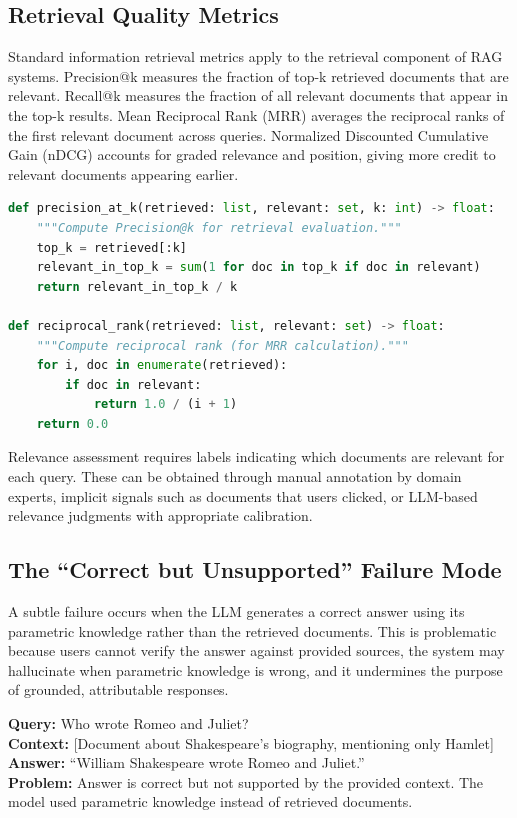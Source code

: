 \subsection{Retrieval Quality Metrics}

Standard information retrieval metrics apply to the retrieval component of RAG systems. Precision@k measures the fraction of top-k retrieved documents that are relevant. Recall@k measures the fraction of all relevant documents that appear in the top-k results. Mean Reciprocal Rank (MRR) averages the reciprocal ranks of the first relevant document across queries. Normalized Discounted Cumulative Gain (nDCG) accounts for graded relevance and position, giving more credit to relevant documents appearing earlier.

\begin{lstlisting}[basicstyle=\small\ttfamily,language=Python]
def precision_at_k(retrieved: list, relevant: set, k: int) -> float:
    """Compute Precision@k for retrieval evaluation."""
    top_k = retrieved[:k]
    relevant_in_top_k = sum(1 for doc in top_k if doc in relevant)
    return relevant_in_top_k / k

def reciprocal_rank(retrieved: list, relevant: set) -> float:
    """Compute reciprocal rank (for MRR calculation)."""
    for i, doc in enumerate(retrieved):
        if doc in relevant:
            return 1.0 / (i + 1)
    return 0.0
\end{lstlisting}

Relevance assessment requires labels indicating which documents are relevant for each query. These can be obtained through manual annotation by domain experts, implicit signals such as documents that users clicked, or LLM-based relevance judgments with appropriate calibration.

\subsection{The ``Correct but Unsupported'' Failure Mode}

A subtle failure occurs when the LLM generates a correct answer using its parametric knowledge rather than the retrieved documents. This is problematic because users cannot verify the answer against provided sources, the system may hallucinate when parametric knowledge is wrong, and it undermines the purpose of grounded, attributable responses.

\begin{badexample}
\small
\textbf{Query:} Who wrote Romeo and Juliet? \\
\textbf{Context:} [Document about Shakespeare's biography, mentioning only Hamlet] \\
\textbf{Answer:} ``William Shakespeare wrote Romeo and Juliet.'' \\
\textbf{Problem:} Answer is correct but not supported by the provided context. The model used parametric knowledge instead of retrieved documents.
\end{badexample}


